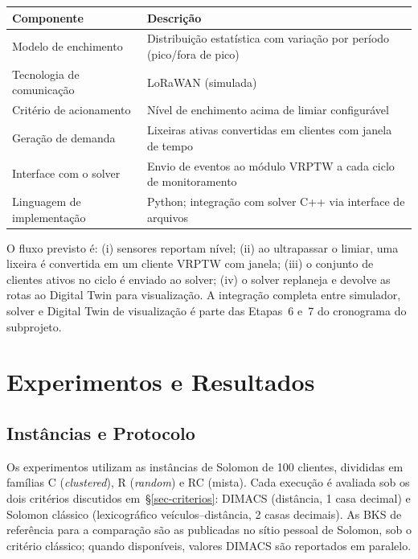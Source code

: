 \documentclass[10pt, a4paper]{article}
\begin{document}
\begin{quadro}[H]
\centering
\caption{Aspectos funcionais do ambiente de simula\c{c}\~ao IoT}
\label{qdr-sensores}
\small
\begin{tabular}{|p{55mm}|p{90mm}|}
\hline
\rowcolor{gray!20}\textbf{Componente} & \textbf{Descri\c{c}\~ao} \\
\hline
Modelo de enchimento & Distribui\c{c}\~ao estat\'istica com varia\c{c}\~ao por per\'iodo (pico/fora de pico) \\
\hline
Tecnologia de comunica\c{c}\~ao & LoRaWAN (simulada) \\
\hline
Crit\'erio de acionamento & N\'ivel de enchimento acima de limiar configur\'avel \\
\hline
Gera\c{c}\~ao de demanda & Lixeiras ativas convertidas em clientes com janela de tempo \\
\hline
Interface com o solver & Envio de eventos ao m\'odulo VRPTW a cada ciclo de monitoramento \\
\hline
Linguagem de implementa\c{c}\~ao & Python; integra\c{c}\~ao com solver C++ via interface de arquivos \\
\hline
\end{tabular}
\end{quadro}

O fluxo previsto \'e: (i) sensores reportam n\'ivel; (ii) ao ultrapassar o limiar, uma lixeira \'e convertida em um cliente VRPTW com janela; (iii) o conjunto de clientes ativos no ciclo \'e enviado ao solver; (iv) o solver replaneja e devolve as rotas ao Digital Twin para visualiza\c{c}\~ao. A integra\c{c}\~ao completa entre simulador, solver e Digital Twin de visualiza\c{c}\~ao \'e parte das Etapas~6 e~7 do cronograma do subprojeto.

\section{Experimentos e Resultados}
\label{sec-experimentos}

\subsection{Inst\^ancias e Protocolo}

Os experimentos utilizam as inst\^ancias de Solomon de 100 clientes, divididas em fam\'ilias C (\textit{clustered}), R (\textit{random}) e RC (mista). Cada execu\c{c}\~ao \'e avaliada sob os dois crit\'erios discutidos em~\S\ref{sec-criterios}: DIMACS (dist\^ancia, 1 casa decimal) e Solomon cl\'assico (lexicogr\'afico ve\'iculos--dist\^ancia, 2 casas decimais). As BKS de refer\^encia para a compara\c{c}\~ao s\~ao as publicadas no s\'itio pessoal de Solomon, sob o crit\'erio cl\'assico; quando dispon\'iveis, valores DIMACS s\~ao reportados em paralelo.
\end{document}
